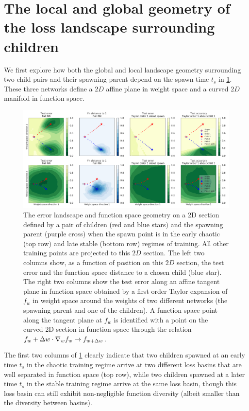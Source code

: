 \documentclass{article}
\begin{document}
\section{The local and global geometry of the loss landscape surrounding children}
\label{sec:childgeo} 
\vspace{-0.3cm}
We first explore how both the global and local landscape geometry surrounding two child pairs and their spawning parent depend on the spawn time $t_s$ in \cref{fig:children_spreading}. These three networks define a $2D$ affine plane in weight space and a curved $2D$ manifold in function space.
\begin{figure}[h]
\centering
\includegraphics[width=0.9\linewidth]{figures/JAX_children_spreading_early_late_18570851.pdf}
\caption{The error landscape and function space geometry on a 2D section defined by a pair of children (red and blue stars) and the spawning parent (purple cross) when the spawn point is in the early chaotic (top row) and late stable (bottom row) regimes of training.
All other training points are projected to this $2D$ section. 
The left two columns show, as a function of position on this $2D$ section, the test error and the function space distance to a chosen child (blue star). 
The right two columns show the test error along an affine tangent plane in function space obtained by a first order Taylor expansion of $f_w$
%
in weight space around the weights of two different networks (the spawning parent and one of the children).  
A function space point along the tangent plane at $f_w$ is identified with a point on the curved 2D section in function space through the relation $f_w + \Delta w \cdot \nabla_w f_w  \rightarrow  f_{w+\Delta w}$. 
%
}
\label{fig:children_spreading}
\vspace{-0.3cm}
\end{figure}
The first two columns of \cref{fig:children_spreading} clearly indicate that two children spawned at an early time $t_s$ in the chaotic training regime arrive at two different loss basins that are well separated in function space (top row), while two children spawned at a later time $t_s$ in the stable training regime arrive at the same loss basin, though this loss basin can still exhibit non-negligible function diversity (albeit smaller than the diversity between basins).  
\end{document}
